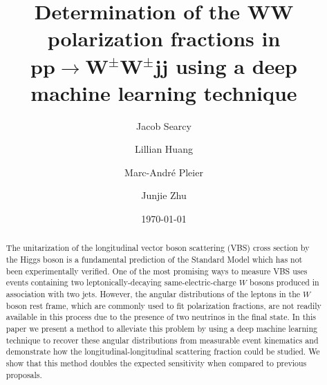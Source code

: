 \documentclass[aps,prl,twocolumn,showpacs,superscriptaddress,groupeaddress,floatfix]{revtex4}  %
\begin{document}
\title{Determination of the $\boldsymbol{WW}$ polarization fractions in $\boldsymbol{pp \rightarrow W^\pm W^\pm jj}$ using a deep machine learning technique}
\author{Jacob Searcy}
\author{Lillian Huang}
\author{Marc-Andr\'e Pleier}
\author{Junjie Zhu}

\date{\today}

\begin{abstract}
The unitarization of the longitudinal vector boson scattering (VBS) cross section by the Higgs boson is 
a fundamental prediction of the Standard Model which has not been experimentally verified. One of the most
promising ways to measure VBS uses events containing two leptonically-decaying same-electric-charge 
$W$ bosons produced in association with two jets. However, the angular distributions of the leptons in the $W$ boson rest frame, which are commonly used to fit polarization fractions, are not readily available in this process due to the presence of two neutrinos in the final state. 
In this paper we present a method to alleviate this problem by using a deep machine learning technique to recover these angular distributions from measurable event kinematics and demonstrate how the longitudinal-longitudinal scattering fraction could be studied. We show that this method doubles the expected sensitivity when compared to previous proposals.

\end{abstract}

\maketitle


\end{document}

